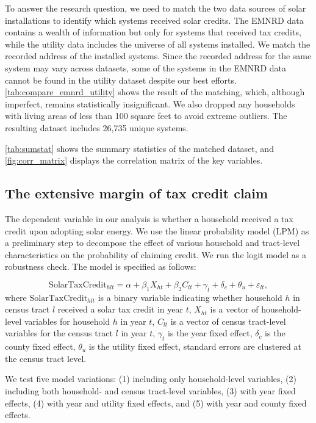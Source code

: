 \documentclass[12pt,twoside,letterpaper]{article}
\begin{document}
To answer the research question, we need to match the two data sources of solar installations to identify which systems received solar credits. The EMNRD data contains a wealth of information but only for systems that received tax credits, while the utility data includes the universe of all systems installed. We match the recorded address of the installed systems. Since the recorded address for the same system may vary across datasets, some of the systems in the EMNRD data cannot be found in the utility dataset despite our best efforts. \autoref{tab:compare_emnrd_utility} shows the result of the matching, which, although imperfect, remains statistically insignificant. We also dropped any households with living areas of less than 100 square feet to avoid extreme outliers. The resulting dataset includes 26,735 unique systems.


\autoref{tab:sumstat} shows the summary statistics of the matched dataset, and \autoref{fig:corr_matrix} displays the correlation matrix of the key variables.




\subsection{The extensive margin of tax credit claim}

The dependent variable in our analysis is whether a household received a tax credit upon adopting solar energy. We use the linear probability model (LPM) as a preliminary step to decompose the effect of various household and tract-level characteristics on the probability of claiming credit. We run the logit model as a robustness check. The model is specified as follows:

\begin{equation}\label{reg_3}
    \text{SolarTaxCredit}_{hlt} = \alpha + \beta_1 X_{ht} + \beta_2 C_{lt}  + \gamma_t +  \delta_c + \theta_u + \varepsilon_{lt},
\end{equation}
where $\text{SolarTaxCredit}_{hlt}$ is a binary variable indicating whether household $h$ in census tract $l$ received a solar tax credit in year $t$, $X_{ht}$ is a vector of household-level variables for household $h$ in year $t$, $C_{lt}$ is a vector of census tract-level variables for the census tract $l$ in year $t$, $\gamma_t$ is the year fixed effect, $\delta_c$ is the county fixed effect, $\theta_u$ is the utility fixed effect, standard errors are clustered at the census tract level.

We test five model variations: (1) including only household-level variables, (2) including both household- and census tract-level variables, (3) with year fixed effects, (4) with year and utility fixed effects, and (5) with year and county fixed effects.
\end{document}
